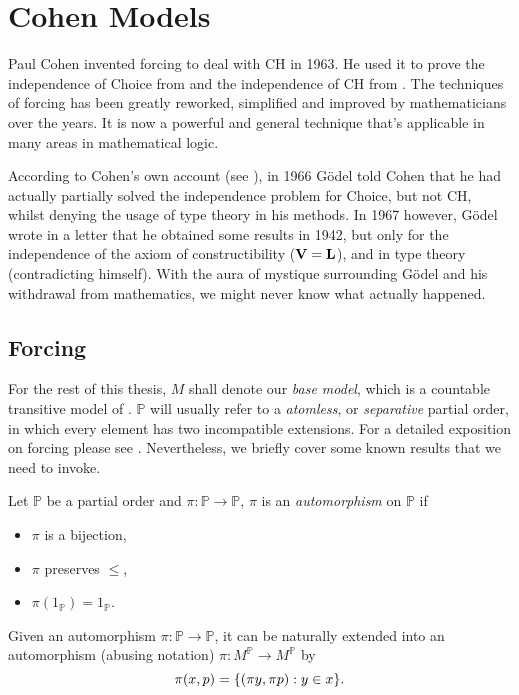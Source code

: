 \chapter{Cohen Models}

Paul Cohen invented forcing to deal with CH in 1963.
He used it to prove the independence of Choice from \ZF and the independence of CH from \ZFC.
The techniques of forcing has been greatly reworked, simplified and improved by mathematicians over the years.
It is now a powerful and general technique that's applicable in many areas in mathematical logic.

According to Cohen's own account (see \autocite[1087]{cohen2002}),
in 1966 Gödel told Cohen that he had actually partially solved the independence problem for Choice, but not CH,
whilst denying the usage of type theory in his methods.
In 1967 however, Gödel wrote in a letter that he obtained some results in 1942,
but only for the independence of the axiom of constructibility (\(\mathbf{V} = \mathbf{L}\)), and in type theory (contradicting himself).
With the aura of mystique surrounding Gödel and his withdrawal from mathematics, we might never know what actually happened.

\section{Forcing}
\renewcommand*{\P}{{\mathbb{P}}}
\newcommand*{\forces}{\Vdash}

For the rest of this thesis, \(M\) shall denote our \emph{base model}, which is a countable transitive model of \ZFC.
\(\P\) will usually refer to a \emph{atomless}, or \emph{separative} partial order, in which every element has two incompatible extensions.
For a detailed exposition on forcing please see \autocite{kunen1980}.
Nevertheless, we briefly cover some known results that we need to invoke.

\begin{definition}
    Let \(\P\) be a partial order and \(\pi: \P\to\P\),
    \(\pi\) is an \emph{automorphism} on \(\P\) if
    \begin{itemize}
        \item \(\pi\) is a bijection,
        \item \(\pi\) preserves \(\leq\),
        \item \(\pi(1_{\P}) = 1_\P\).
    \end{itemize}
\end{definition}

\begin{definition} \label{defn:extend_automorphism_to_names}
    Given an automorphism \(\pi:\P\to\P\),
    it can be naturally extended into an automorphism (abusing notation) \(\pi: M^{\mathbb{P}} \to M^{\mathbb{P}}\) by
    \[ \pi(x,p) = {\left\{ (\pi y , \pi p ): y\in x \right\}}. \]
\end{definition}

